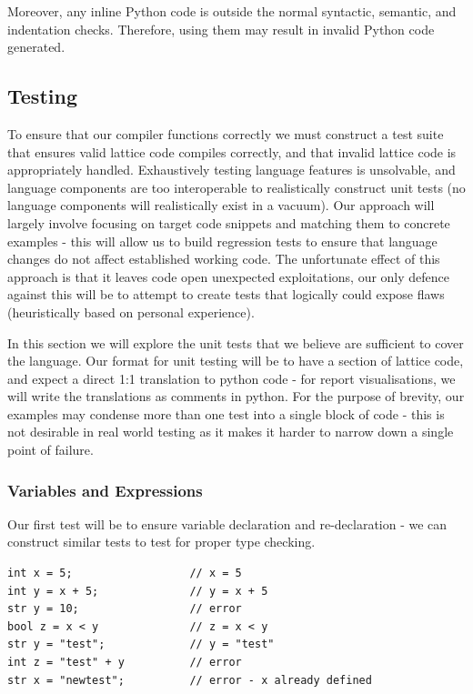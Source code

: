 Moreover, any inline Python code is outside the normal syntactic, semantic, and indentation checks.
Therefore, using them may result in invalid Python code generated.
\subsection{Testing}
To ensure that our compiler functions correctly we must construct a test suite that ensures valid lattice code compiles
correctly, and that invalid lattice code is appropriately handled.
Exhaustively testing language features is unsolvable, and language components are too interoperable to realistically
construct unit tests (no language components will realistically exist in a vacuum).
Our approach will largely involve focusing on target code snippets and matching them to concrete examples - this will
allow us to build regression tests to ensure that language changes do not affect established working code.
The unfortunate effect of this approach is that it leaves code open unexpected exploitations, our only defence against
this will be to attempt to create tests that logically could expose flaws (heuristically based on personal experience).

In this section we will explore the unit tests that we believe are sufficient to cover the language.
Our format for unit testing will be to have a section of lattice code, and expect a direct 1:1 translation to
python code - for report visualisations, we will write the translations as comments in python.
For the purpose of brevity, our examples may condense more than one test into a single block of code - this is not
desirable in real world testing as it makes it harder to narrow down a single point of failure.

\subsubsection{Variables and Expressions}
Our first test will be to ensure variable declaration and re-declaration - we can construct similar tests to test for
proper type checking.

\begin{lstlisting}[caption={Testing that variable declaration and type checking work},captionpos=b, label={lst:lattice-typing-test}]
int x = 5;                  // x = 5
int y = x + 5;              // y = x + 5
str y = 10;                 // error
bool z = x < y              // z = x < y
str y = "test";             // y = "test"
int z = "test" + y          // error
str x = "newtest";          // error - x already defined
\end{lstlisting}

